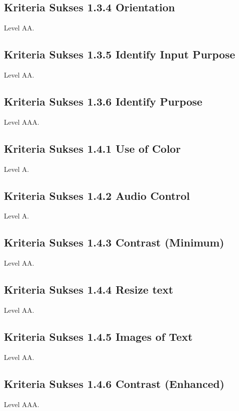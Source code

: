 \subsection{Kriteria Sukses 1.3.4 Orientation}
\label{sec:kriteria_1.3.4}
Level AA.

\subsection{Kriteria Sukses 1.3.5 Identify Input Purpose}
\label{sec:kriteria_1.3.5}
Level AA.

\subsection{Kriteria Sukses 1.3.6 Identify Purpose}
\label{sec:kriteria_1.3.6}
Level AAA.

\subsection{Kriteria Sukses 1.4.1 Use of Color}
\label{sec:kriteria_1.4.1}
Level A.

\subsection{Kriteria Sukses 1.4.2 Audio Control}
\label{sec:kriteria_1.4.2}
Level A.

\subsection{Kriteria Sukses 1.4.3 Contrast (Minimum)}
\label{sec:kriteria_1.4.3}
Level AA.

\subsection{Kriteria Sukses 1.4.4 Resize text}
\label{sec:kriteria_1.4.4}
Level AA.

\subsection{Kriteria Sukses 1.4.5 Images of Text}
\label{sec:kriteria_1.4.5}
Level AA.

\subsection{Kriteria Sukses 1.4.6 Contrast (Enhanced)}
\label{sec:kriteria_1.4.6}
Level AAA.

